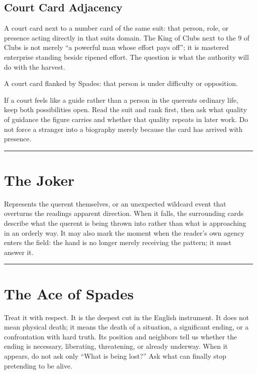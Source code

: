 \subsection{Court Card Adjacency}\label{court-card-adjacency}

A court card next to a number card of the same suit: that person, role, or
presence acting directly in that suit\textquotesingle s domain. The King of Clubs
next to the 9 of Clubs is not merely ``a powerful man whose effort pays off'';
it is mastered enterprise standing beside ripened effort. The question is what
the authority will do with the harvest.

A court card flanked by Spades: that person is under difficulty or opposition.

If a court feels like a guide rather than a person in the querent\textquotesingle s
ordinary life, keep both possibilities open. Read the suit and rank first, then
ask what quality of guidance the figure carries and whether that quality repeats
in later work. Do not force a stranger into a biography merely because the card
has arrived with presence.

\begin{center}\rule{0.5\linewidth}{0.5pt}\end{center}

\section{The Joker}\label{the-joker}

Represents the querent themselves, or an unexpected wildcard event that
overturns the reading\textquotesingle s apparent direction. When it falls, the
surrounding cards describe what the querent is being thrown into rather than
what is approaching in an orderly way. It may also mark the moment when the
reader's own agency enters the field: the hand is no longer merely receiving
the pattern; it must answer it.

\begin{center}\rule{0.5\linewidth}{0.5pt}\end{center}

\section{The Ace of Spades}\label{the-ace-of-spades}

Treat it with respect. It is the deepest cut in the English instrument. It does
not mean physical death; it means the death of a situation, a significant
ending, or a confrontation with hard truth. Its position and neighbors tell us
whether the ending is necessary, liberating, threatening, or already underway.
When it appears, do not ask only ``What is being lost?'' Ask what can finally
stop pretending to be alive.


